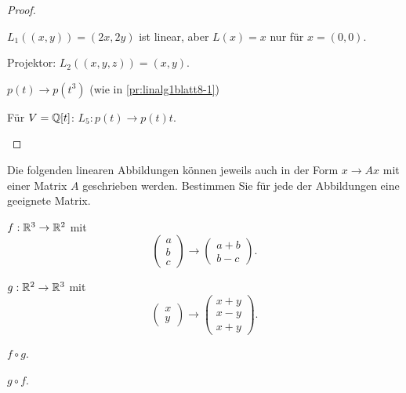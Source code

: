 \begin{proof}
	\begin{parts}
	\item $L_1((x,y))=(2x,2y)$ ist linear, aber $L(x)=x$ nur f\"{u}r $x=(0,0)$.
	\item Projektor: $L_2((x,y,z))=(x,y)$.
	\item $p(t)\to p(t^3)$ (wie in \ref{pr:linalg1blatt8-1})
	\item F\"{u}r $V=\mathbb{Q}[t]$: $L_5:p(t)\to p(t)t$.\qedhere
	\end{parts}
\end{proof}

\begin{Problem}
Die folgenden linearen Abbildungen können jeweils auch in der Form $x\to Ax$ mit einer Matrix $A$ geschrieben werden. Bestimmen Sie für jede der Abbildungen eine geeignete Matrix. 	
\begin{parts}
\item $f:\mathbb{R}^3\to \mathbb{R}^2$ mit
	\[
	\begin{pmatrix} a \\ b \\ c \end{pmatrix} \to \begin{pmatrix} a +b\\b-c \end{pmatrix} 
	.\] 
\item $g:\mathbb{R}^2\to \mathbb{R}^3$ mit
	\[
	\begin{pmatrix} x \\ y \end{pmatrix} \to \begin{pmatrix} x+y\\x-y\\x+y \end{pmatrix} 
	.\] 
\item $f\circ g$.
\item $g\circ f$.
\end{parts}
\end{Problem}

